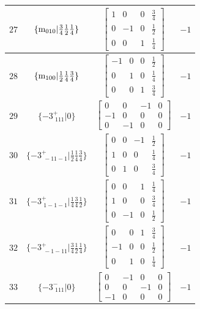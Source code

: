 \documentclass[fleqn,8pt]{jsarticle}
\begin{document}
\begin{longtable}{cccc}
$ 27 $ & $ \{{\rm m}_{010}|\frac{3}{4} \frac{1}{2} \frac{1}{4}\} $ & $ \begin{bmatrix} 1 & 0 & 0 & \frac{3}{4} \\ 0 & -1 & 0 & \frac{1}{2} \\ 0 & 0 & 1 & \frac{1}{4} \end{bmatrix} $ & $ -1 $ \\ \hline
$ 28 $ & $ \{{\rm m}_{100}|\frac{1}{2} \frac{1}{4} \frac{3}{4}\} $ & $ \begin{bmatrix} -1 & 0 & 0 & \frac{1}{2} \\ 0 & 1 & 0 & \frac{1}{4} \\ 0 & 0 & 1 & \frac{3}{4} \end{bmatrix} $ & $ -1 $ \\ \hline
$ 29 $ & $ \{-3^{+}_{\,\,111}|0\} $ & $ \begin{bmatrix} 0 & 0 & -1 & 0 \\ -1 & 0 & 0 & 0 \\ 0 & -1 & 0 & 0 \end{bmatrix} $ & $ -1 $ \\ \hline
$ 30 $ & $ \{-3^{+}_{\,\,-11-1}|\frac{1}{2} \frac{1}{4} \frac{3}{4}\} $ & $ \begin{bmatrix} 0 & 0 & -1 & \frac{1}{2} \\ 1 & 0 & 0 & \frac{1}{4} \\ 0 & 1 & 0 & \frac{3}{4} \end{bmatrix} $ & $ -1 $ \\ \hline
$ 31 $ & $ \{-3^{+}_{\,\,1-1-1}|\frac{1}{4} \frac{3}{4} \frac{1}{2}\} $ & $ \begin{bmatrix} 0 & 0 & 1 & \frac{1}{4} \\ 1 & 0 & 0 & \frac{3}{4} \\ 0 & -1 & 0 & \frac{1}{2} \end{bmatrix} $ & $ -1 $ \\ \hline
$ 32 $ & $ \{-3^{+}_{\,\,-1-11}|\frac{3}{4} \frac{1}{2} \frac{1}{4}\} $ & $ \begin{bmatrix} 0 & 0 & 1 & \frac{3}{4} \\ -1 & 0 & 0 & \frac{1}{2} \\ 0 & 1 & 0 & \frac{1}{4} \end{bmatrix} $ & $ -1 $ \\ \hline
$ 33 $ & $ \{-3^{-}_{\,\,111}|0\} $ & $ \begin{bmatrix} 0 & -1 & 0 & 0 \\ 0 & 0 & -1 & 0 \\ -1 & 0 & 0 & 0 \end{bmatrix} $ & $ -1 $ \\ \hline

\end{longtable}
\end{document}
